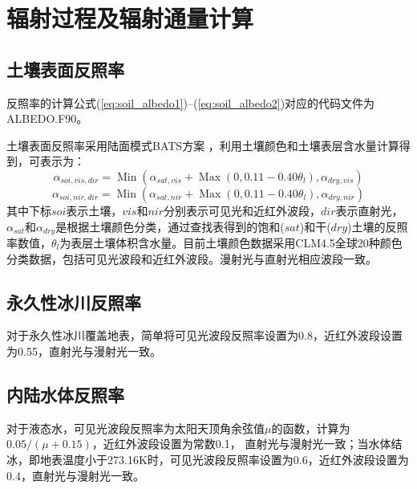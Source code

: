 \chapter{辐射过程及辐射通量计算}
\section{土壤表面反照率}
反照率的计算公式(\ref{eq:soil_albedo1})--(\ref{eq:soil_albedo2})对应的代码文件为ALBEDO.F90。

土壤表面反照率采用陆面模式BATS方案 \citep{dickinson1986biosphere,dickinson1993biosphere}，利用土壤颜色和土壤表层含水量计算得到，可表示为：
\begin{equation}\label{eq:soil_albedo1}
\alpha_{soi,vis,dir}=\operatorname{Min}\left(\alpha_{sat, vis}+\operatorname{Max}\left(0,0.11-0.40 \theta_{l}\right), \alpha_{dry, vis}\right)
\end{equation}
\begin{equation}
\alpha_{soi,nir,dir}=\operatorname{Min}\left(\alpha_{sat, nir}+\operatorname{Max}\left(0,0.11-0.40 \theta_{l}\right), \alpha_{dry, nir}\right)
\end{equation}
其中下标$soi$表示土壤，$vis$和$nir$分别表示可见光和近红外波段，$dir$表示直射光，$\alpha_{sat}$和$\alpha_{d r y}$是根据土壤颜色分类，通过查找表得到的饱和($sat$)和干($dry$)土壤的反照率数值，$\theta_{l}$为表层土壤体积含水量。目前土壤颜色数据采用CLM4.5全球20种颜色分类数据，包括可见光波段和近红外波段。漫射光与直射光相应波段一致。

\section{永久性冰川反照率}
对于永久性冰川覆盖地表，简单将可见光波段反照率设置为0.8，近红外波段设置为0.55，直射光与漫射光一致。


\section{内陆水体反照率}
对于液态水，可见光波段反照率为太阳天顶角余弦值$\mu$的函数，计算为$0.05/(\mu+0.15)$，近红外波段设置为常数0.1，
直射光与漫射光一致；当水体结冰，即地表温度小于273.16K时，可见光波段反照率设置为0.6，近红外波段设置为0.4，直射光与漫射光一致。

